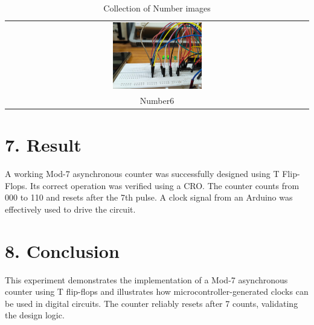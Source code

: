 \documentclass[a4paper,12pt]{article}
\begin{document}
\begin{table}[H]
\begin{tabular}{ccc}
        \multicolumn{3}{c}{\includegraphics[width=0.3\textwidth]{figs/6.jpeg}} \\
        \multicolumn{3}{c}{Number6}
    \end{tabular}
    \caption{Collection of Number images}
    \label{tab:numbers}
\end{table}

\section*{7. Result}
A working Mod-7 asynchronous counter was successfully designed using T Flip-Flops. Its correct operation was verified using a CRO. The counter counts from 000 to 110 and resets after the 7th pulse. A clock signal from an Arduino was effectively used to drive the circuit.

\section*{8. Conclusion}
This experiment demonstrates the implementation of a Mod-7 asynchronous counter using T flip-flops and illustrates how microcontroller-generated clocks can be used in digital circuits. The counter reliably resets after 7 counts, validating the design logic.
\end{document}
